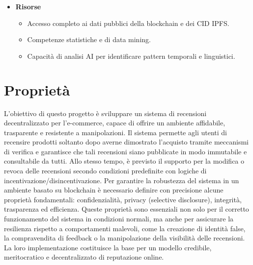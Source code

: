\begin{itemize}
\begin{itemize}
                    \item \textbf{Risorse}
                        \begin{itemize}
                            \item Accesso completo ai dati pubblici della blockchain e dei CID IPFS.
                            
                            \item Competenze statistiche e di data mining.
                            
                            \item Capacità di analisi AI per identificare pattern temporali e linguistici.
                        \end{itemize}
                \end{itemize}
        \end{itemize}
    
    \section{Proprietà}
        L'obiettivo di questo progetto è sviluppare un sistema di recensioni decentralizzato per l’e-commerce, capace di offrire un ambiente affidabile, trasparente e resistente a manipolazioni. Il sistema permette agli utenti di recensire prodotti soltanto dopo averne dimostrato l'acquisto tramite meccanismi di verifica e garantisce che tali recensioni siano pubblicate in modo immutabile e consultabile da tutti. Allo stesso tempo, è previsto il supporto per la modifica o revoca delle recensioni secondo condizioni predefinite con logiche di incentivazione/disincentivazione. Per garantire la robustezza del sistema in un ambiente basato su blockchain è necessario definire con precisione alcune proprietà fondamentali: confidenzialità, privacy (selective disclosure), integrità, trasparenza ed efficienza. Queste proprietà sono essenziali non solo per il corretto funzionamento del sistema in condizioni normali, ma anche per assicurare la resilienza rispetto a comportamenti malevoli, come la creazione di identità false, la compravendita di feedback o la manipolazione della visibilità delle recensioni. La loro implementazione costituisce la base per un modello credibile, meritocratico e decentralizzato di reputazione online.
        
